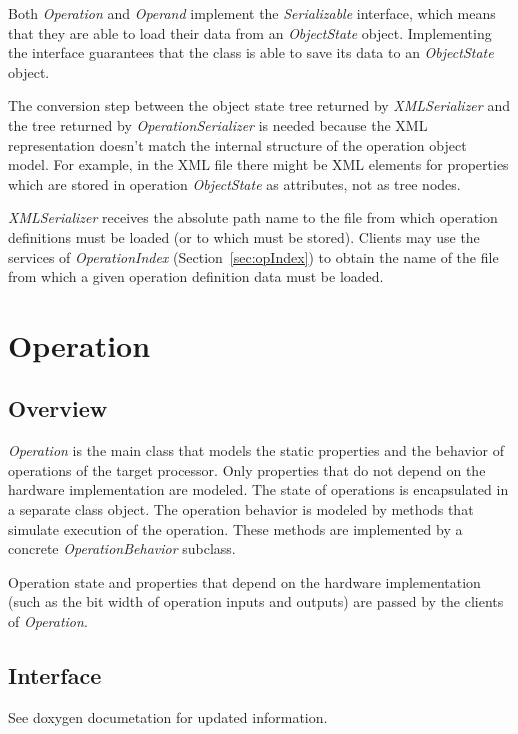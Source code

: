 \documentclass[a4paper,twoside]{tce}
\begin{document}
Both \emph{Operation} and \emph{Operand} implement the \emph{Serializable}
interface, which means that they are able to load their data from an
\emph{ObjectState} object. Implementing the interface guarantees that the
class is able to save its data to an \emph{ObjectState} object.

The conversion step between the object state tree returned by
\emph{XMLSerializer} and the tree returned by \emph{OperationSerializer} is
needed because the XML representation doesn't match the internal structure
of the operation object model.  For example, in the XML file there might be
XML elements for properties which are stored in operation \emph{ObjectState}
as attributes, not as tree nodes.

\emph{XMLSerializer} receives the absolute path name to the file from which
operation definitions must be loaded (or to which must be stored).  Clients
may use the services of \emph{OperationIndex} (Section~\ref{sec:opIndex}) to
obtain the name of the file from which a given operation definition data
must be loaded.


\section{Operation}
\label{sec:operation}

\subsection{Overview}

\emph{Operation} is the main class that models the static properties and the
behavior of operations of the target processor.  Only properties that do not
depend on the hardware implementation are modeled.  The state of operations
is encapsulated in a separate class object.  The operation behavior is
modeled by methods that simulate execution of the operation.  These methods
are implemented by a concrete \emph{OperationBehavior} subclass.

Operation state and properties that depend on the hardware implementation
(such as the bit width of operation inputs and outputs) are passed by the
clients of \emph{Operation}.

\subsection{Interface}

See doxygen documetation for updated information.
\end{document}
